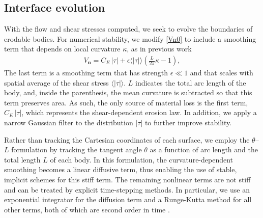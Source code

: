 \documentclass[3p]{elsarticle}
\newcommand{\nn}{{\mathbf{n}}}
\newcommand{\abs}[1]{\left| #1 \right|}
\newcommand{\Vn}{V_\nn}
\newcommand{\CE}{C_E}
\newcommand{\thL}{$\theta$--$L$}
\begin{document}
\subsection{Interface evolution}

With the flow and shear stresses computed, we seek to evolve the boundaries of erodable bodies. For numerical stability, we modify \eqref{Vn0} to include a smoothing term that depends on local curvature $\kappa$, as in previous work \citep{quaife2018boundary}
\begin{align}
  \Vn = \CE \, \abs{\tau} + \epsilon \langle\abs{\tau}\rangle \left(
    \frac{L}{2\pi} \kappa - 1 \right),
\end{align}
The last term is a smoothing term that has strength $\epsilon \ll 1$ and that scales with spatial average of the shear stress $\langle\abs{\tau}\rangle$. $L$ indicates the total arc length of the body, and, inside the parenthesis,  the mean curvature is subtracted so that this term preserves area. As such, the only source of material loss is the first term, $\CE \, \abs{\tau}$, which represents the shear-dependent erosion law. In addition, we apply a narrow Gaussian filter to the distribution $\abs{\tau}$ to further improve stability.

Rather than tracking the Cartesian coordinates of each surface, we employ the {\thL} formulation \cite{hou-low-she1994, MooreCPAM2017, mac2022morphological} by tracking the tangent angle $\theta$ as a function of arc length and the total length $L$ of each body.  In this formulation, the curvature-dependent smoothing becomes a linear diffusive term, thus enabling the use of stable, implicit schemes for this stiff term. The remaining nonlinear terms are not stiff and can be treated by explicit time-stepping methods. In particular, we use an exponential integrator for the diffusion term and a Runge-Kutta method for all other terms, both of which are second order in time \cite{quaife2018boundary}.


\end{document}

